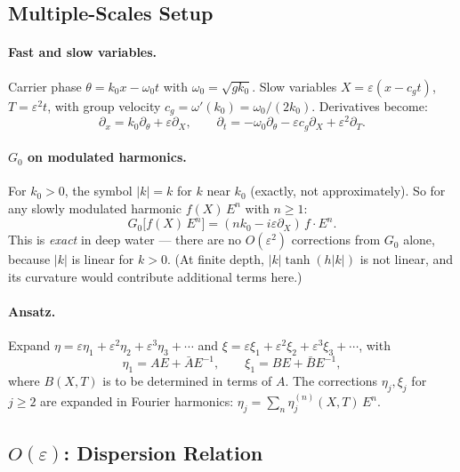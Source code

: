 \documentclass[11pt]{article}
\newcommand{\eps}{\varepsilon}
\begin{document}
\subsection{Multiple-Scales Setup}

\paragraph{Fast and slow variables.}
Carrier phase $\theta = k_0 x - \omega_0 t$ with $\omega_0 = \sqrt{gk_0}$.
Slow variables $X = \eps(x - c_g t)$, $T = \eps^2 t$, with group velocity
$c_g = \omega'(k_0) = \omega_0/(2k_0)$.
Derivatives become:
\begin{equation}
\partial_x = k_0\partial_\theta + \eps\partial_X, \qquad
\partial_t = -\omega_0\partial_\theta - \eps c_g\partial_X + \eps^2\partial_T.
\label{eq:deriv_rules}
\end{equation}

\paragraph{$G_0$ on modulated harmonics.}
For $k_0 > 0$, the symbol $|k| = k$ for $k$ near $k_0$ (exactly, not approximately).
So for any slowly modulated harmonic $f(X)\,E^n$ with $n \geq 1$:
\begin{equation}
G_0\bigl[f(X)\,E^n\bigr]
= (nk_0 - i\eps\partial_X)\,f\cdot E^n.
\label{eq:G0_modulated}
\end{equation}
This is \emph{exact} in deep water --- there are no $O(\eps^2)$ corrections
from $G_0$ alone, because $|k|$ is linear for $k > 0$.
(At finite depth, $|k|\tanh(h|k|)$ is not linear, and its curvature
would contribute additional terms here.)

\paragraph{Ansatz.}
Expand $\eta = \eps\eta_1 + \eps^2\eta_2 + \eps^3\eta_3 + \cdots$ and
$\xi = \eps\xi_1 + \eps^2\xi_2 + \eps^3\xi_3 + \cdots$, with
\begin{equation}
\eta_1 = AE + \bar A E^{-1}, \qquad
\xi_1 = BE + \bar B E^{-1},
\label{eq:leading_order}
\end{equation}
where $B(X,T)$ is to be determined in terms of $A$.
The corrections $\eta_j, \xi_j$ for $j \geq 2$ are expanded in Fourier
harmonics: $\eta_j = \sum_n \eta_j^{(n)}(X,T)\,E^n$.


\subsection{$O(\eps)$: Dispersion Relation}
\end{document}

